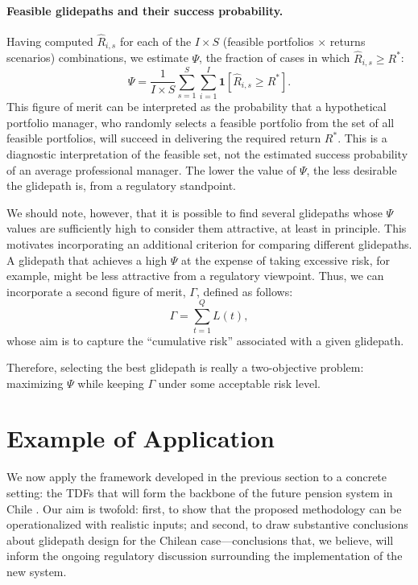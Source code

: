 \documentclass[11pt]{article}
\newcommand{\Rstar}{R^{*}}
\begin{document}
\paragraph{Feasible glidepaths and their success probability.}
Having computed $\widehat{R}_{i,s}$ for each of the $I \times S$ (feasible portfolios $\times$ returns scenarios) combinations, we estimate $\Psi$, the fraction of cases in which $\widehat{R}_{i,s} \geq \Rstar$:
\begin{equation}
\Psi = \frac{1}{I \times S}\sum_{s=1}^{S}\sum_{i=1}^{I}
\mathbf{1}\left[\widehat{R}_{i,s} \geq \Rstar \right].
\label{eq:psi-estimator}
\end{equation}
This figure of merit can be interpreted as the probability that a hypothetical portfolio manager, who randomly selects a feasible portfolio from the set of all feasible portfolios, will succeed in delivering the required return $\Rstar$. This is a diagnostic interpretation of the feasible set, not the estimated success probability of an average professional manager. The lower the value of $\Psi$, the less desirable the glidepath is, from a regulatory standpoint.

We should note, however, that it is possible to find several glidepaths whose $\Psi$ values are sufficiently high to consider them attractive, at least in principle. This motivates incorporating an additional criterion for comparing different  glidepaths.  A glidepath that achieves a high $\Psi$ at the expense of taking excessive risk, for example, might be less attractive from a regulatory viewpoint. Thus, we can incorporate a second figure of merit, $\Gamma$, defined as follows:
\begin{equation}
\Gamma = \sum_{t=1}^{Q}L(t),
\end{equation}
whose aim is to capture the ``cumulative risk'' associated with a given glidepath.

Therefore, selecting the best glidepath is really a two-objective problem: maximizing $\Psi$ while keeping $\Gamma$ under some acceptable risk level.

\section{Example of Application}

We now apply the framework developed in the previous section to a 
concrete setting: the TDFs that will form the backbone of the future 
pension system in Chile \cite{ley21735}. Our aim is twofold: first, 
to show that the proposed methodology can be operationalized with 
realistic inputs; and second, to draw substantive conclusions about 
glidepath design for the Chilean case---conclusions that, we believe, 
will inform the ongoing regulatory discussion surrounding the 
implementation of the new system.
\end{document}
